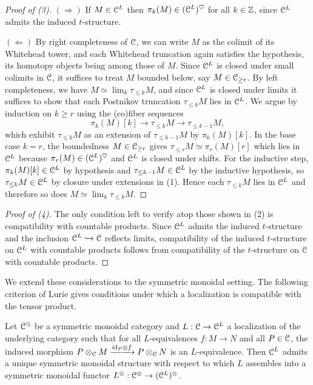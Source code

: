 \begin{proof}[Proof of (3)]
    $(\Rightarrow)$ If $M\in\EuScript{C}^{L}$ then $\pi_{k}(M)\in(\EuScript{C}^{L})^{\heartsuit}$ for all $k\in\mathbb{Z}$, since $\EuScript{C}^{L}$ admits the induced $t$-structure.

    $(\Leftarrow)$ By right completeness of $\EuScript{C}$, we can write $M$ as the colimit of its Whitehead tower, and each Whitehead truncation again satisfies the hypothesis, its homotopy objects being among those of $M$. Since $\EuScript{C}^{L}$ is closed under small colimits in $\EuScript{C}$, it suffices to treat $M$ bounded below, say $M\in\EuScript{C}_{\geq r}$. By left completeness, we have $M\simeq\lim_{k}\tau_{\leq k}M$, and since $\EuScript{C}^{L}$ is closed under limits it suffices to show that each Postnikov truncation $\tau_{\leq k}M$ lies in $\EuScript{C}^{L}$. We argue by induction on $k\geq r$ using the (co)fiber sequences 
    $$\pi_{k}(M)[k]\to\tau_{\leq k}M\to\tau_{\leq k-1}M,$$
    which exhibit $\tau_{\leq k}M$ as an extension of $\tau_{\leq k-1}M$ by $\pi_{k}(M)[k]$. In the base case $k=r$, the boundedness $M\in\EuScript{C}_{\geq r}$ gives $\tau_{\leq r}M\simeq\pi_{r}(M)[r]$ which lies in $\EuScript{C}^{L}$ because $\pi_{r}(M)\in(\EuScript{C}^{L})^{\heartsuit}$ and $\EuScript{C}^{L}$ is closed under shifts. For the inductive step, $\pi_{k}(M)[k]\in\EuScript{C}^{L}$ by hypothesis and $\tau_{\leq k-1}M\in\EuScript{C}^{L}$ by the inductive hypothesis, so $\tau_{\leq k}M\in\EuScript{C}^{L}$ by closure under extensions in (1). Hence each $\tau_{\leq k}M$ lies in $\EuScript{C}^{L}$ and therefore so does $M\simeq\lim_{k}\tau_{\leq k}M$.
\end{proof}
\begin{proof}[Proof of (4)]
    The only condition left to verify atop those shown in (2) is compatibility with countable products. Since $\EuScript{C}^{L}$ admits the induced $t$-structure and the inclusion $\EuScript{C}^{L}\hookrightarrow\EuScript{C}$ reflects limits, compatibility of the induced $t$-structure on $\EuScript{C}^{L}$ with countable products follows from compatibility of the $t$-structure on $\EuScript{C}$ with countable products. 
\end{proof}
We extend these considerations to the symmetric monoidal setting. The following criterion of Lurie gives conditions under which a localization is compatible with the tensor product.
\begin{proposition}[{\cite[Prop. 2.2.1.9]{HA}}]\label{prop: sym mon localizations}
    Let $\EuScript{C}^{\otimes}$ be a symmetric monoidal category and $L:\EuScript{C}\to\EuScript{C}^{L}$ a localization of the underlying category such that for all $L$-equivalences $f:M\to N$ and all $P\in\EuScript{C}$, the induced morphism $P\otimes_{\EuScript{C}}M\xrightarrow{\mathrm{id}_{P}\otimes f}P\otimes_{\EuScript{C}}N$ is an $L$-equivalence. Then $\EuScript{C}^{L}$ admits a unique symmetric monoidal structure with respect to which $L$ assembles into a symmetric monoidal functor $L^{\otimes}:\EuScript{C}^{\otimes}\to(\EuScript{C}^{L})^{\otimes}$. 
\end{proposition}
